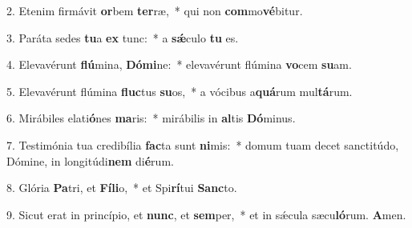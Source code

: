 
2. Etenim firmávit \textbf{or}bem \textbf{ter}ræ,~* qui non \textbf{com}mo\textbf{vé}bitur.

3. Paráta sedes \textbf{tu}a \textbf{ex} tunc:~* a \textbf{s\'{\ae}}culo \textbf{tu} es.

4. Elevavérunt \textbf{flú}mina, \textbf{Dó}\textbf{mi}ne:~* elevavérunt flúmina \textbf{vo}cem \textbf{su}am.

5. Elevavérunt flúmina \textbf{fluc}tus \textbf{su}os,~* a vócibus a\textbf{quá}rum mul\textbf{tá}rum.

6. Mirábiles elati\textbf{ó}nes \textbf{ma}ris:~* mirábilis in \textbf{al}tis \textbf{Dó}minus.

7. Testimónia tua credibília \textbf{fac}ta sunt \textbf{ni}mis:~* domum tuam decet sanctitúdo, Dómine, in longitúdi\textbf{nem} di\textbf{é}rum.

8. Glória \textbf{Pa}tri, et \textbf{Fí}\textbf{li}o,~* et Spi\textbf{rí}tui \textbf{Sanc}to.

9. Sicut erat in princípio, et \textbf{nunc}, et \textbf{sem}per,~* et in s\'{\ae}cula sæcu\textbf{ló}rum. \textbf{A}men.
